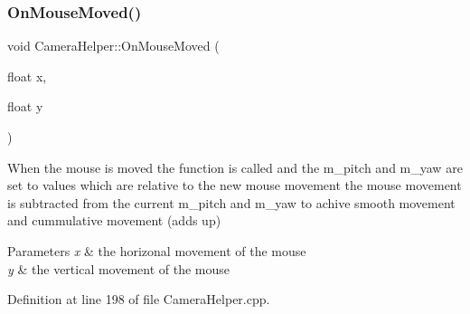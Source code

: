 \subsubsection{\texorpdfstring{On\+Mouse\+Moved()}{OnMouseMoved()}}
{\footnotesize\ttfamily void Camera\+Helper\+::\+On\+Mouse\+Moved (\begin{DoxyParamCaption}\item[{float}]{x,  }\item[{float}]{y }\end{DoxyParamCaption})}

When the mouse is moved the function is called and the m\+\_\+pitch and m\+\_\+yaw are set to values which are relative to the new mouse movement the mouse movement is subtracted from the current m\+\_\+pitch and m\+\_\+yaw to achive smooth movement and cummulative movement (adds up) 
\begin{DoxyParams}{Parameters}
{\em x} & the horizonal movement of the mouse \\
\hline
{\em y} & the vertical movement of the mouse \\
\hline
\end{DoxyParams}


Definition at line 198 of file Camera\+Helper.\+cpp.


